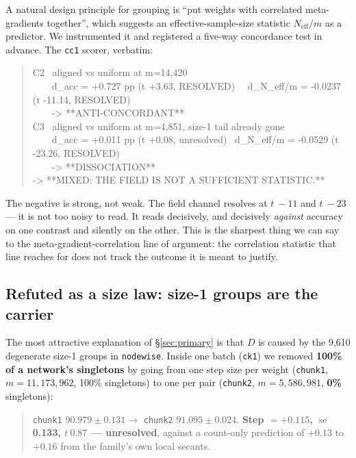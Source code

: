 \documentclass[10pt,letterpaper]{article}
\newcommand{\Dstat}{D}                         %
\newcommand{\arm}[1]{\texttt{#1}}
\DeclareMathOperator{\se}{se}
\begin{document}
A natural design principle for grouping is ``put weights with correlated meta-gradients
together'', which suggests an effective-sample-size statistic $N_{\mathrm{eff}}/m$ as a
predictor. We instrumented it and registered a five-way concordance test in advance. The
\arm{cc1} scorer, verbatim:

\begin{quote}\ttfamily\footnotesize
C2 \ aligned vs uniform at m=14,420\\
\ \ \ \ d\_acc = +0.727 pp (t +3.63, RESOLVED) \ \ d\_N\_eff/m = -0.0237 (t -11.14, RESOLVED)\\
\ \ \ \ -> **ANTI-CONCORDANT**\\
C3 \ aligned vs uniform at m=4,851, size-1 tail already gone\\
\ \ \ \ d\_acc = +0.011 pp (t +0.08, unresolved) \ d\_N\_eff/m = -0.0529 (t -23.26, RESOLVED)\\
\ \ \ \ -> **DISSOCIATION**\\
-> **MIXED: THE FIELD IS NOT A SUFFICIENT STATISTIC.**
\end{quote}

The negative is strong, not weak. The field channel resolves at $t\ -11$ and $t\ -23$ --- it is
not too noisy to read. It reads decisively, and decisively \emph{against} accuracy on one contrast
and silently on the other. This is the sharpest thing we can say to the meta-gradient-correlation
line of argument: the correlation statistic that line reaches for does not track the outcome it is
meant to justify.

\subsection{Refuted as a size law: size-1 groups are the carrier}
\label{sec:size1}

The most attractive explanation of \S\ref{sec:primary} is that $\Dstat$ is caused by the 9{,}610
degenerate size-1 groups in \arm{nodewise}. Inside one batch (\arm{ck1}) we removed \textbf{100\%
of a network's singletons} by going from one step size per weight (\arm{chunk1},
$m = 11{,}173{,}962$, 100\% singletons) to one per pair (\arm{chunk2}, $m = 5{,}586{,}981$,
\textbf{0\%} singletons):

\begin{quote}
\arm{chunk1} $90.979 \pm 0.131 \rightarrow$ \arm{chunk2} $91.095 \pm 0.024$. \textbf{Step
$= +0.115$, $\se$ 0.133, $t\ 0.87$ --- unresolved}, against a count-only prediction of $+0.13$ to
$+0.16$ from the family's own local secants.
\end{quote}
\end{document}
